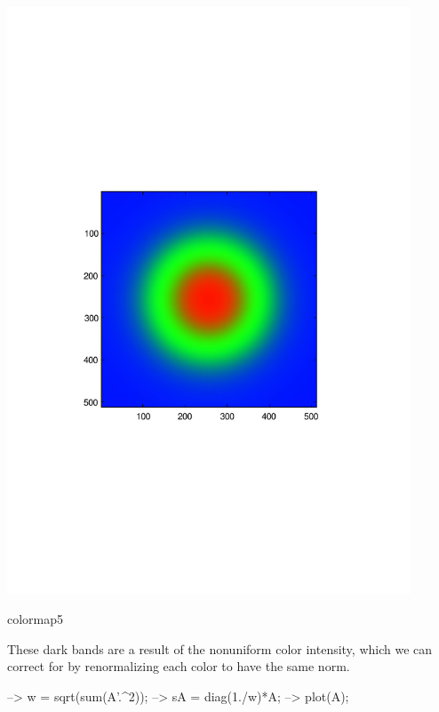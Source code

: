  
\begin{DoxyImage}
\includegraphics[width=12cm]{colormap5}
\caption{colormap5}
\end{DoxyImage}


These dark bands are a result of the nonuniform color intensity, which we can correct for by renormalizing each color to have the same norm.


\begin{DoxyVerbInclude}
--> w = sqrt(sum(A'.^2));
--> sA = diag(1./w)*A;
--> plot(A);
\end{DoxyVerbInclude}


